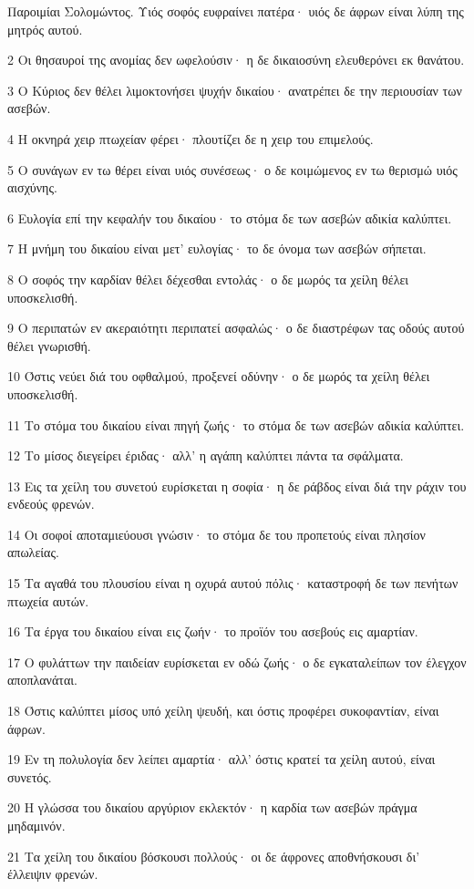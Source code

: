 \par Παροιμίαι Σολομώντος. Υιός σοφός ευφραίνει πατέρα· υιός δε άφρων είναι λύπη της μητρός αυτού.
\par 2 Οι θησαυροί της ανομίας δεν ωφελούσιν· η δε δικαιοσύνη ελευθερόνει εκ θανάτου.
\par 3 Ο Κύριος δεν θέλει λιμοκτονήσει ψυχήν δικαίου· ανατρέπει δε την περιουσίαν των ασεβών.
\par 4 Η οκνηρά χειρ πτωχείαν φέρει· πλουτίζει δε η χειρ του επιμελούς.
\par 5 Ο συνάγων εν τω θέρει είναι υιός συνέσεως· ο δε κοιμώμενος εν τω θερισμώ υιός αισχύνης.
\par 6 Ευλογία επί την κεφαλήν του δικαίου· το στόμα δε των ασεβών αδικία καλύπτει.
\par 7 Η μνήμη του δικαίου είναι μετ' ευλογίας· το δε όνομα των ασεβών σήπεται.
\par 8 Ο σοφός την καρδίαν θέλει δέχεσθαι εντολάς· ο δε μωρός τα χείλη θέλει υποσκελισθή.
\par 9 Ο περιπατών εν ακεραιότητι περιπατεί ασφαλώς· ο δε διαστρέφων τας οδούς αυτού θέλει γνωρισθή.
\par 10 Όστις νεύει διά του οφθαλμού, προξενεί οδύνην· ο δε μωρός τα χείλη θέλει υποσκελισθή.
\par 11 Το στόμα του δικαίου είναι πηγή ζωής· το στόμα δε των ασεβών αδικία καλύπτει.
\par 12 Το μίσος διεγείρει έριδας· αλλ' η αγάπη καλύπτει πάντα τα σφάλματα.
\par 13 Εις τα χείλη του συνετού ευρίσκεται η σοφία· η δε ράβδος είναι διά την ράχιν του ενδεούς φρενών.
\par 14 Οι σοφοί αποταμιεύουσι γνώσιν· το στόμα δε του προπετούς είναι πλησίον απωλείας.
\par 15 Τα αγαθά του πλουσίου είναι η οχυρά αυτού πόλις· καταστροφή δε των πενήτων πτωχεία αυτών.
\par 16 Τα έργα του δικαίου είναι εις ζωήν· το προϊόν του ασεβούς εις αμαρτίαν.
\par 17 Ο φυλάττων την παιδείαν ευρίσκεται εν οδώ ζωής· ο δε εγκαταλείπων τον έλεγχον αποπλανάται.
\par 18 Όστις καλύπτει μίσος υπό χείλη ψευδή, και όστις προφέρει συκοφαντίαν, είναι άφρων.
\par 19 Εν τη πολυλογία δεν λείπει αμαρτία· αλλ' όστις κρατεί τα χείλη αυτού, είναι συνετός.
\par 20 Η γλώσσα του δικαίου αργύριον εκλεκτόν· η καρδία των ασεβών πράγμα μηδαμινόν.
\par 21 Τα χείλη του δικαίου βόσκουσι πολλούς· οι δε άφρονες αποθνήσκουσι δι' έλλειψιν φρενών.
